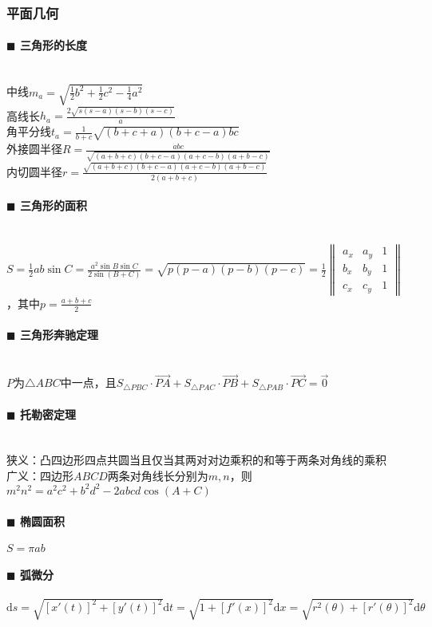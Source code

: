 \subsubsection{平面几何}
\paragraph{$\blacksquare$ 三角形的长度}
\noindent \\
中线$m_a=\sqrt{\frac{1}{2} b^2+\frac{1}{2} c^2-\frac{1}{4} a^2}$\\
高线长$h_a=\frac{2\sqrt{s(s-a)(s-b)(s-c)}}{a}$\\
角平分线$t_a=\frac{1}{b+c} \sqrt{(b+c+a)(b+c-a)bc}$\\
外接圆半径$R=\frac{abc}{\sqrt{(a+b+c)(b+c-a)(a+c-b)(a+b-c)}}$\\
内切圆半径$r=\frac{\sqrt{(a+b+c)(b+c-a)(a+c-b)(a+b-c)}}{2(a+b+c)}$
\paragraph{$\blacksquare$ 三角形的面积}
\noindent \\
$S=\frac{1}{2} ab\sin C=\frac{a^2\sin B\sin C}{2\sin (B+C)}=\sqrt{p(p-a)(p-b)(p-c)}=\frac{1}{2}\begin{Vmatrix} a_x & a_y & 1\\ b_x & b_y & 1\\ c_x & c_y & 1 \end{Vmatrix}$，其中$p=\frac{a+b+c}{2}$
\paragraph{$\blacksquare$ 三角形奔驰定理}
\noindent \\
$P$为$\triangle ABC$中一点，且$S_{\triangle PBC} \cdot \overrightarrow{PA}+S_{\triangle PAC} \cdot \overrightarrow{PB}+S_{\triangle PAB} \cdot \overrightarrow{PC}=\vec 0$
\paragraph{$\blacksquare$ 托勒密定理}
\noindent \\
狭义：凸四边形四点共圆当且仅当其两对对边乘积的和等于两条对角线的乘积\\
广义：四边形$ABCD$两条对角线长分别为$m, n$，则$m^2 n^2=a^2 c^2+b^2 d^2-2abcd \cos(A+C)$
\paragraph{$\blacksquare$ 椭圆面积}
$S=\pi ab$
\paragraph{$\blacksquare$ 弧微分}
$\mathrm{d}s=\sqrt{[x'(t)]^2+[y'(t)]^2} \mathrm{d} t=\sqrt{1+[f'(x)]^2} \mathrm{d} x=\sqrt{r^2(\theta)+[r'(\theta)]^2} \mathrm{d} \theta$
